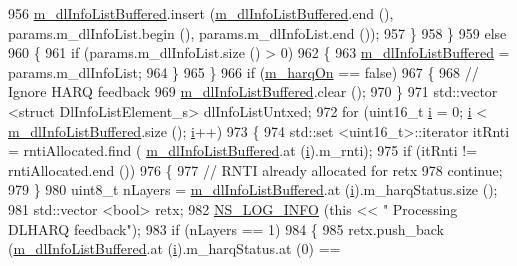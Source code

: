 \begin{DoxyCode}
956           \hyperlink{classns3_1_1CqaFfMacScheduler_aabc929a8c1c30338a5fa0826bb7cd2b8}{m\_dlInfoListBuffered}.insert (\hyperlink{classns3_1_1CqaFfMacScheduler_aabc929a8c1c30338a5fa0826bb7cd2b8}{m\_dlInfoListBuffered}.end (),
       params.m\_dlInfoList.begin (), params.m\_dlInfoList.end ());
957         \}
958     \}
959   \textcolor{keywordflow}{else}
960     \{
961       \textcolor{keywordflow}{if} (params.m\_dlInfoList.size () > 0)
962         \{
963           \hyperlink{classns3_1_1CqaFfMacScheduler_aabc929a8c1c30338a5fa0826bb7cd2b8}{m\_dlInfoListBuffered} = params.m\_dlInfoList;
964         \}
965     \}
966   \textcolor{keywordflow}{if} (\hyperlink{classns3_1_1CqaFfMacScheduler_afcb424ab57ad0d96293a7970c0b55dcf}{m\_harqOn} == \textcolor{keyword}{false})
967     \{
968       \textcolor{comment}{// Ignore HARQ feedback}
969       \hyperlink{classns3_1_1CqaFfMacScheduler_aabc929a8c1c30338a5fa0826bb7cd2b8}{m\_dlInfoListBuffered}.clear ();
970     \}
971   std::vector <struct DlInfoListElement\_s> dlInfoListUntxed;
972   \textcolor{keywordflow}{for} (uint16\_t \hyperlink{bernuolliDistribution_8m_a6f6ccfcf58b31cb6412107d9d5281426}{i} = 0; \hyperlink{bernuolliDistribution_8m_a6f6ccfcf58b31cb6412107d9d5281426}{i} < \hyperlink{classns3_1_1CqaFfMacScheduler_aabc929a8c1c30338a5fa0826bb7cd2b8}{m\_dlInfoListBuffered}.size (); \hyperlink{bernuolliDistribution_8m_a6f6ccfcf58b31cb6412107d9d5281426}{i}++)
973     \{
974       std::set <uint16\_t>::iterator itRnti = rntiAllocated.find (
      \hyperlink{classns3_1_1CqaFfMacScheduler_aabc929a8c1c30338a5fa0826bb7cd2b8}{m\_dlInfoListBuffered}.at (\hyperlink{bernuolliDistribution_8m_a6f6ccfcf58b31cb6412107d9d5281426}{i}).m\_rnti);
975       \textcolor{keywordflow}{if} (itRnti != rntiAllocated.end ())
976         \{
977           \textcolor{comment}{// RNTI already allocated for retx}
978           \textcolor{keywordflow}{continue};
979         \}
980       uint8\_t nLayers = \hyperlink{classns3_1_1CqaFfMacScheduler_aabc929a8c1c30338a5fa0826bb7cd2b8}{m\_dlInfoListBuffered}.at (\hyperlink{bernuolliDistribution_8m_a6f6ccfcf58b31cb6412107d9d5281426}{i}).m\_harqStatus.size ();
981       std::vector <bool> retx;
982       \hyperlink{group__logging_gafbd73ee2cf9f26b319f49086d8e860fb}{NS\_LOG\_INFO} (\textcolor{keyword}{this} << \textcolor{stringliteral}{" Processing DLHARQ feedback"});
983       \textcolor{keywordflow}{if} (nLayers == 1)
984         \{
985           retx.push\_back (\hyperlink{classns3_1_1CqaFfMacScheduler_aabc929a8c1c30338a5fa0826bb7cd2b8}{m\_dlInfoListBuffered}.at (\hyperlink{bernuolliDistribution_8m_a6f6ccfcf58b31cb6412107d9d5281426}{i}).m\_harqStatus.at (0) == 

\end{DoxyCode}

